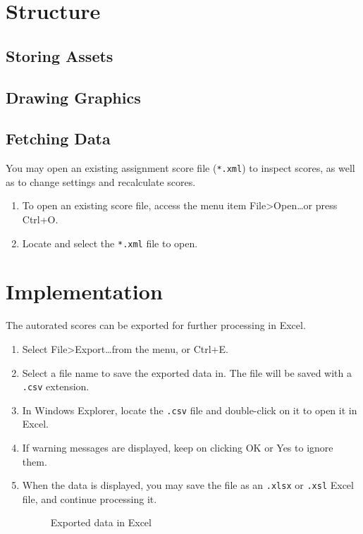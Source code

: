 \documentclass[a4paper,11pt]{refart}
\begin{document}
\newpage
\section{Structure}

\subsection{Storing Assets}

\subsection{Drawing Graphics}

\subsection{Fetching Data}


You may open an existing assignment score file (\texttt{*.xml}) to inspect scores, as well as to change settings and recalculate scores.
\begin{enumerate}
\item To open an existing score file, access the menu item File>Open\ldots or press Ctrl+O.
\item Locate and select the \texttt{*.xml} file to open.
\end{enumerate}



\newpage
\section{Implementation}
The autorated scores can be exported for further processing in Excel.
\begin{enumerate}
\item Select File>Export\ldots from the menu, or Ctrl+E.
\item Select a file name to save the exported data in. The file will be saved with a \texttt{.csv} extension. %
\item In Windows Explorer, locate the \texttt{.csv} file and double-click on it to open it in Excel.
\item If warning messages are displayed, keep on clicking OK or Yes to ignore them.
\item When the data is displayed, you may save the file as an \texttt{.xlsx} or \texttt{.xsl} Excel file, and continue processing it.

\begin{figure}[hbt!]
\caption{Exported data in Excel}
\end{figure}

\end{enumerate}


\newpage


\end{document}
